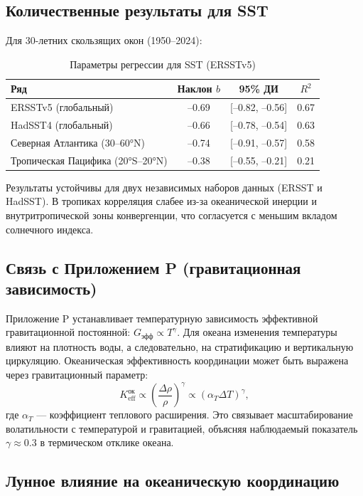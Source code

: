 \documentclass[12pt,a4paper]{article}
\newcommand{\Keff}{K_{\mathrm{eff}}}
\newcommand{\ga}{\gamma}
\begin{document}
	\subsection{Количественные результаты для SST}
	
	Для 30-летних скользящих окон (1950–2024):
	
	\begin{table}[htbp]
		\centering
		\caption{Параметры регрессии для SST (ERSSTv5)}
		\label{tab:sst_reg}
		\begin{tabular}{@{}lccc@{}}
			\toprule
			Ряд & Наклон \(b\) & 95\% ДИ & \(R^2\) \\
			\midrule
			ERSSTv5 (глобальный) & –0.69 & [–0.82, –0.56] & 0.67 \\
			HadSST4 (глобальный)  & –0.66 & [–0.78, –0.54] & 0.63 \\
			Северная Атлантика (30–60°N) & –0.74 & [–0.91, –0.57] & 0.58 \\
			Тропическая Пацифика (20°S–20°N) & –0.38 & [–0.55, –0.21] & 0.21 \\
			\bottomrule
		\end{tabular}
	\end{table}
	
	Результаты устойчивы для двух независимых наборов данных (ERSST и HadSST). В тропиках корреляция слабее из-за океанической инерции и внутритропической зоны конвергенции, что согласуется с меньшим вкладом солнечного индекса.
	
	\subsection{Связь с Приложением P (гравитационная зависимость)}
	
	Приложение P устанавливает температурную зависимость эффективной гравитационной постоянной: \(G_{\text{эфф}} \propto T^{\ga}\). Для океана изменения температуры влияют на плотность воды, а следовательно, на стратификацию и вертикальную циркуляцию. Океаническая эффективность координации может быть выражена через гравитационный параметр:
	\[
	\Keff^{\text{ок}} \propto \left( \frac{\Delta \rho}{\rho} \right)^{\ga} \propto (\alpha_T \Delta T)^{\ga},
	\]
	где \(\alpha_T\) — коэффициент теплового расширения. Это связывает масштабирование волатильности с температурой и гравитацией, объясняя наблюдаемый показатель \(\ga \approx 0.3\) в термическом отклике океана.
	
	\subsection{Лунное влияние на океаническую координацию}
	
\end{document}
